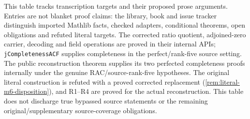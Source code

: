 \documentclass[11pt,oneside]{article}
\theoremstyle{definition}
\theoremstyle{remark}
\newcommand{\lean}[1]{\nolinkurl{#1}}
\begin{document}
This table tracks transcription targets and their proposed prose arguments. Entries are
not blanket proof claims: the library, book and issue tracker distinguish imported
Mathlib facts, checked adapters, conditional theorems, open obligations and refuted
literal targets. The corrected ratio quotient, adjoined-zero carrier, decoding and field
operations are proved in their internal APIs; \lean{jCompletenessACF} supplies completeness
in the perfect/rank-five source setting. The public reconstruction theorem supplies its
two perfected completeness proofs internally under the genuine RAC/source-rank-five
hypotheses. The original literal construction is refuted with a proved corrected
replacement (\cref{rem:literal-m6-disposition}), and R1--R4 are proved for the actual
reconstruction. This table does not discharge true bypassed source statements or the
remaining original/supplementary source-coverage obligations.
\end{document}
